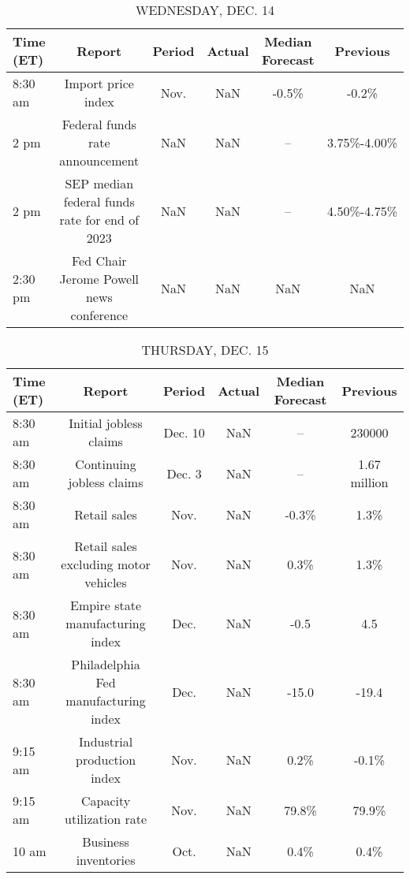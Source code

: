 \documentclass{article}%
\begin{document}
%


\begin{table}[htbp]%
\caption{WEDNESDAY, DEC. 14}%
\centering%
\begin{adjustbox}{width=1\textwidth}%
\begin{tabular}{lccccc}
\toprule
Time (ET) &                                        Report & Period & Actual & Median Forecast &    Previous \\
\midrule
  8:30 am &                            Import price index &   Nov. &    NaN &           -0.5\% &       -0.2\% \\
     2 pm &               Federal funds rate announcement &    NaN &    NaN &              -- & 3.75\%-4.00\% \\
     2 pm & SEP median federal funds rate for end of 2023 &    NaN &    NaN &              -- & 4.50\%-4.75\% \\
  2:30 pm &       Fed Chair Jerome Powell news conference &    NaN &    NaN &             NaN &         NaN \\
\bottomrule
\end{tabular}
%
\end{adjustbox}%
\end{table}

%


\begin{table}[htbp]%
\caption{THURSDAY, DEC. 15}%
\centering%
\begin{adjustbox}{width=1\textwidth}%
\begin{tabular}{lccccc}
\toprule
Time (ET) &                                Report &  Period & Actual & Median Forecast &     Previous \\
\midrule
  8:30 am &                Initial jobless claims & Dec. 10 &    NaN &              -- &       230000 \\
  8:30 am &             Continuing jobless claims &  Dec. 3 &    NaN &              -- & 1.67 million \\
  8:30 am &                          Retail sales &    Nov. &    NaN &           -0.3\% &         1.3\% \\
  8:30 am & Retail sales excluding motor vehicles &    Nov. &    NaN &            0.3\% &         1.3\% \\
  8:30 am &      Empire state manufacturing index &    Dec. &    NaN &            -0.5 &          4.5 \\
  8:30 am &  Philadelphia Fed manufacturing index &    Dec. &    NaN &           -15.0 &        -19.4 \\
  9:15 am &           Industrial production index &    Nov. &    NaN &            0.2\% &        -0.1\% \\
  9:15 am &             Capacity utilization rate &    Nov. &    NaN &           79.8\% &        79.9\% \\
    10 am &                  Business inventories &    Oct. &    NaN &            0.4\% &         0.4\% \\
\bottomrule
\end{tabular}
%
\end{adjustbox}%
\end{table}
\end{document}
